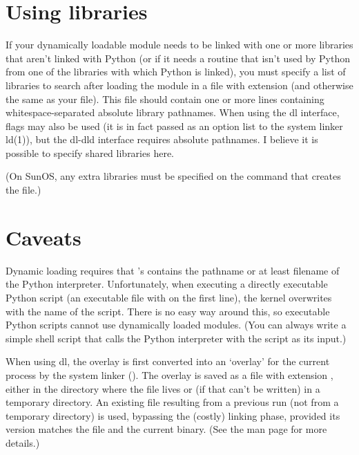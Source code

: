 \section{Using libraries}

If your dynamically loadable module needs to be linked with one or
more libraries that aren't linked with Python (or if it needs a
routine that isn't used by Python from one of the libraries with which
Python is linked), you must specify a list of libraries to search
after loading the module in a file with extension  (and
otherwise the same as your  file).  This file should contain
one or more lines containing whitespace-separated absolute library
pathnames.  When using the dl interface,  flags may also
be used (it is in fact passed as an option list to the system linker
ld(1)), but the dl-dld interface requires absolute pathnames.  I
believe it is possible to specify shared libraries here.

(On SunOS, any extra libraries must be specified on the 
command that creates the  file.)


\section{Caveats}

Dynamic loading requires that 's  contains
the pathname or at least filename of the Python interpreter.
Unfortunately, when executing a directly executable Python script (an
executable file with  on the first line), the kernel
overwrites  with the name of the script.  There is no
easy way around this, so executable Python scripts cannot use
dynamically loaded modules.  (You can always write a simple shell
script that calls the Python interpreter with the script as its
input.)

When using dl, the overlay is first converted into an `overlay' for
the current process by the system linker ().  The overlay is
saved as a file with extension , either in the directory
where the  file lives or (if that can't be written) in a
temporary directory.  An existing  file resulting from a
previous run (not from a temporary directory) is used, bypassing the
(costly) linking phase, provided its version matches the 
file and the current binary.  (See the  man page for more
details.)





